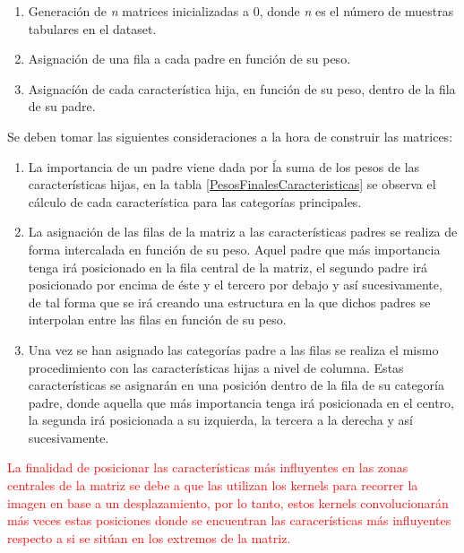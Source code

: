         \begin{enumerate}

            \item Generación de \textit{n} matrices inicializadas a 0, donde \textit{n} es el número de muestras tabulares en el dataset.
            \item Asignación de una fila a cada padre en función de su peso.
            \item Asignacíón de cada característica hija, en función de su peso, dentro de la fila de su padre.
        
        \end{enumerate}

        Se deben tomar las siguientes consideraciones a la hora de construir las matrices:

        \begin{enumerate}

            \item La importancia de un padre viene dada por ĺa suma de los pesos de las características hijas, en la tabla \eqref{PesosFinalesCaracteristicas} se observa el cálculo de cada característica para las categorías principales.

            \item La asignación de las filas de la matriz a las características padres se realiza de forma intercalada en función de su peso. Aquel padre que más importancia tenga irá posicionado en la fila central de la matriz, el segundo padre irá posicionado por encima de éste y el tercero por debajo y así sucesivamente, de tal forma que se irá creando una estructura en la que dichos padres se interpolan entre las filas en función de su peso.

            \item Una vez se han asignado las categorías padre a las filas se realiza el mismo procedimiento con las características hijas a nivel de columna. Estas características se asignarán en una posición dentro de la fila de su categoría padre, donde aquella que más importancia tenga irá posicionada en el centro, la segunda irá posicionada a su izquierda, la tercera a la derecha y así sucesivamente.
        \end{enumerate}


        \textcolor{red}{La finalidad de posicionar las características más influyentes en las zonas centrales de la matriz se debe a que las  utilizan los kernels para recorrer la imagen en base a un desplazamiento, por lo tanto, estos kernels convolucionarán más veces estas posiciones donde se encuentran las caracerísticas más influyentes respecto a si se sitúan en los extremos de la matriz.}

